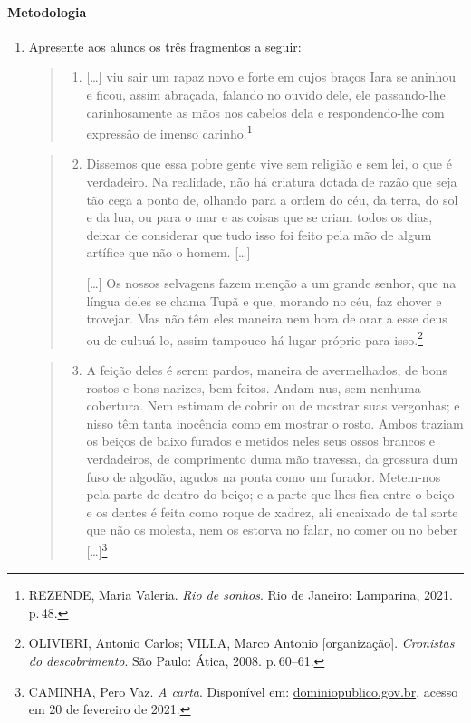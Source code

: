 \documentclass[12pt]{extarticle}
\begin{document}
\paragraph{Metodologia}
\begin{enumerate}
\item Apresente aos alunos os três fragmentos a seguir:


\begin{quote}
\begin{enumerate}
\item{[}\ldots{}{]} viu sair um rapaz novo e forte em cujos braços Iara
se aninhou e ficou, assim abraçada, falando no ouvido dele, ele
passando-lhe carinhosamente as mãos nos cabelos dela e
respondendo-lhe com expressão de imenso carinho.\footnote{REZENDE, Maria Valeria. \emph{Rio de sonhos}. Rio de Janeiro: Lamparina, 2021. p.\,48.}
\end{enumerate}
\end{quote}

\begin{quote}
\begin{enumerate}
\setcounter{enumii}{1}
\item Dissemos que essa pobre gente vive sem religião e sem lei, o que é
verdadeiro. Na realidade, não há criatura dotada de razão que seja
tão cega a ponto de, olhando para a ordem do céu, da terra, do sol e
da lua, ou para o mar e as coisas que se criam todos os dias, deixar
de considerar que tudo isso foi feito pela mão de algum artífice que
não o homem. {[}\ldots{}{]}


{[}\ldots{}{]} Os nossos selvagens fazem menção a um grande senhor,
que na língua deles se chama Tupã e que, morando no céu, faz chover
e trovejar. Mas não têm eles maneira nem hora de orar a esse deus ou
de cultuá-lo, assim tampouco há lugar próprio para isso.\footnote{OLIVIERI, Antonio Carlos; VILLA, Marco Antonio {[}organização{]}. \emph{Cronistas do descobrimento}. São Paulo: Ática, 2008. p.\,60--61.}
\end{enumerate}
\end{quote}


\begin{quote}
\begin{enumerate}
\setcounter{enumii}{2}
\item A feição deles é serem pardos, maneira de avermelhados, de bons
rostos e bons narizes, bem-feitos. Andam nus, sem nenhuma cobertura.
Nem estimam de cobrir ou de mostrar suas vergonhas; e nisso têm
tanta inocência como em mostrar o rosto. Ambos traziam os beiços de
baixo furados e metidos neles seus ossos brancos e verdadeiros, de
comprimento duma mão travessa, da grossura dum fuso de algodão,
agudos na ponta como um furador. Metem-nos pela parte de dentro do
beiço; e a parte que lhes fica entre o beiço e os dentes é feita
como roque de xadrez, ali encaixado de tal sorte que não os molesta,
nem os estorva no falar, no comer ou no beber {[}\ldots{}{]}\footnote{CAMINHA, Pero Vaz. \emph{A carta}. Disponível em:
\href{http://www.dominiopublico.gov.br/pesquisa/DetalheObraForm.do?select_action=\&co_obra=17424}{dominiopublico.gov.br},
acesso em 20 de fevereiro de 2021.}
\end{enumerate}
\end{quote}


\end{enumerate}
\end{document}
